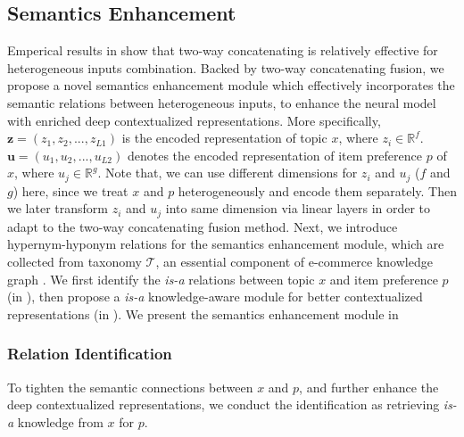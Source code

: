 



\subsection{Semantics Enhancement}
\label{sec:semantics}
Emperical results in  show that two-way concatenating is relatively effective for heterogeneous inputs combination.
Backed by two-way concatenating fusion, 
we propose a novel semantics enhancement module 
which effectively incorporates the semantic relations
between heterogeneous inputs,
to enhance the neural model
with enriched deep contextualized representations.
More specifically, 
$\textbf{z}=(z_1, z_2, ..., z_{L1})$ is the encoded representation of topic $x$,
where $z_i \in \mathbb{R}^{f}$.
$\textbf{u}=(u_1, u_2, ..., u_{L2})$ denotes the encoded representation of item preference $p$ of $x$, where $u_j \in \mathbb{ R }^{g}$.
Note that, we can use different dimensions for $z_i$ and $u_j$ ($f$ and $g$) here, 
since we treat $x$ and $p$ heterogeneously and encode them separately.
Then we later transform $z_i$ and $u_j$ into same dimension via linear layers in order to adapt to the two-way concatenating fusion method.
Next, we introduce hypernym-hyponym relations for the semantics enhancement module, which are collected from taxonomy $\mathcal{T}$, an essential component of  e-commerce knowledge graph
.
We first identify the \emph{is-a} relations between topic $x$ and item preference $p$ 
(in ),
then propose a \emph{is-a} knowledge-aware module for better contextualized representations
(in ).
We present the semantics enhancement module
in 

\subsubsection{Relation Identification}
\label{sec:identification}
To tighten the semantic connections between $x$ and $p$,
and further enhance the deep contextualized representations,
we conduct the identification as retrieving 
\emph{is-a} knowledge from $x$ for $p$.

